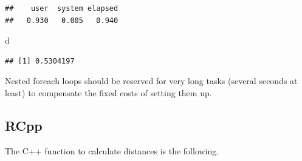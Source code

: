 \documentclass[
  12pt,
  american,
  a4paper,
  extrafontsizes,onecolumn,openright
  ]{memoir}
\newenvironment{Shaded}{\begin{snugshade}}{\end{snugshade}}
\newcommand{\NormalTok}[1]{#1}
\begin{document}
\begin{verbatim}
##    user  system elapsed 
##   0.930   0.005   0.940
\end{verbatim}

\begin{Shaded}
\begin{Highlighting}[]
\NormalTok{d}
\end{Highlighting}
\end{Shaded}

\begin{verbatim}
## [1] 0.5304197
\end{verbatim}

\normalsize

Nested foreach loops should be reserved for very long tasks (several seconds at least) to compensate the fixed costs of setting them up.

\subsection{RCpp}\label{rcpp}

The C++ function to calculate distances is the following.

\scriptsize
\end{document}
